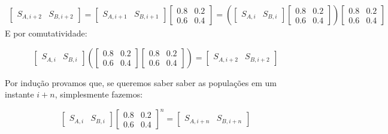 \documentclass[12pt]{article}
\begin{document}
\begin{align*}
\begin{bmatrix}
S_{A, i+2} & S_{B, i+2}
\end{bmatrix} 
=
\begin{bmatrix}
S_{A, i+1} & S_{B, i+1}
\end{bmatrix}
\begin{bmatrix}
0.8 & 0.2\\
0.6 & 0.4
\end{bmatrix}
=
\left(
\begin{bmatrix}
S_{A, i} & S_{B, i}
\end{bmatrix}
\begin{bmatrix}
0.8 & 0.2\\
0.6 & 0.4
\end{bmatrix}
\right)
\begin{bmatrix}
0.8 & 0.2\\
0.6 & 0.4
\end{bmatrix}
\end{align*}
E por comutatividade:

$$
\begin{bmatrix}
S_{A, i} & S_{B, i}
\end{bmatrix}
\left(
\begin{bmatrix}
0.8 & 0.2\\
0.6 & 0.4
\end{bmatrix}
\begin{bmatrix}
0.8 & 0.2\\
0.6 & 0.4
\end{bmatrix}
\right)
=
\begin{bmatrix}
S_{A, i+2} & S_{B, i+2}
\end{bmatrix}
$$

Por indução provamos que, se queremos saber saber as populações em um instante $i + n$, simplesmente fazemos:

\begin{equation}
\begin{bmatrix}
S_{A, i} & S_{B, i}
\end{bmatrix}
\begin{bmatrix}
0.8 & 0.2\\
0.6 & 0.4
\end{bmatrix}^n
=
\begin{bmatrix}
S_{A, i+n} & S_{B, i+n}
\end{bmatrix}
\end{equation}
\end{document}
